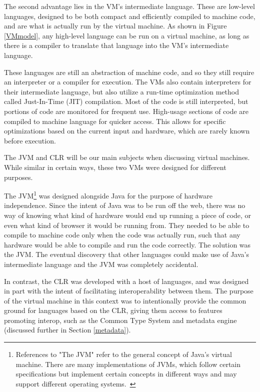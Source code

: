 \documentclass{sig-alternate}
\begin{document}
The second advantage lies in the VM's intermediate language. These are low-level languages, designed to be both compact and efficiently compiled to machine code, and are what is actually run by the virtual machine. As shown in Figure \ref{VMmodel}, any high-level language can be run on a virtual machine, as long as there is a compiler to translate that language into the VM's intermediate language.

These languages are still an abstraction of machine code, and so they still require an interpreter or a compiler for execution.
The VMs also contain interpreters for their intermediate language, but also utilize a run-time optimization method called Just-In-Time (JIT) compilation. Most of the code is still interpreted, but portions of code are monitored for frequent use. High-usage sections of code are compiled to machine language for quicker access. This allows for specific optimizations based on the current input and hardware, which are rarely known before execution.~\cite{wiki:JIT}



The JVM and CLR will be our main subjects when discussing virtual machines. While similar in certain ways, these two VMs were designed for different purposes.

The JVM\footnote{References to "The JVM" refer to the general concept of Java's virtual machine. There are many implementations of JVMs, which follow certain specifications but implement certain concepts in different ways and may support different operating systems.~\cite{wiki:multiJVM, wiki:JVM}}
was designed alongside Java for the purpose of hardware independence. Since the intent of Java was to be run off the web, there was no way of knowing what kind of hardware would end up running a piece of code, or even what kind of browser it would be running from. They needed to be able to compile to machine code only when the code was actually run, such that any hardware would be able to compile and run the code correctly. The solution was the JVM. The eventual discovery that other languages could make use of Java's intermediate language and the JVM was completely accidental.

In contrast, the CLR was developed with a host of languages, and was designed in part with the intent of facilitating interoperability between them. The purpose of the virtual machine in this context was to intentionally provide the common ground for languages based on the CLR, giving them access to features promoting interop, such as the Common Type System and metadata engine (discussed further in Section \ref{metadata}).
\end{document}
